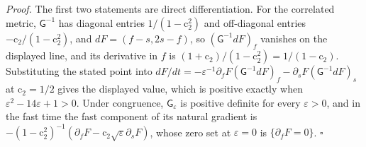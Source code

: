 \noindent\emph{Proof.}
The first two statements are direct differentiation. For the correlated metric,
$\mathsf G^{-1}$ has diagonal entries $1/(1-\mathrm c_2^2)$ and off-diagonal entries
$-\mathrm c_2/(1-\mathrm c_2^2)$, and $dF=(f-s,2s-f)$, so $(\mathsf G^{-1}dF)_f$ vanishes on the displayed line, and
its derivative in $f$ is $(1+\mathrm c_2)/(1-\mathrm c_2^2)=1/(1-\mathrm c_2)$.
Substituting the stated point into
$dF/dt=-\varepsilon^{-1}\partial_fF(\mathsf G^{-1}dF)_f-\partial_sF(\mathsf G^{-1}dF)_s$
at $\mathrm c_2=1/2$ gives the displayed value, which is positive exactly when
$\varepsilon^2-14\varepsilon+1>0$. Under congruence, $\mathsf G_\varepsilon$ is
positive definite for every $\varepsilon>0$, and in the fast time the fast
component of its natural gradient is
$-(1-\mathrm c_2^2)^{-1}(\partial_fF-\mathrm c_2\sqrt\varepsilon\partial_sF)$, whose
zero set at $\varepsilon=0$ is $\{\partial_fF=0\}$. $\square$

